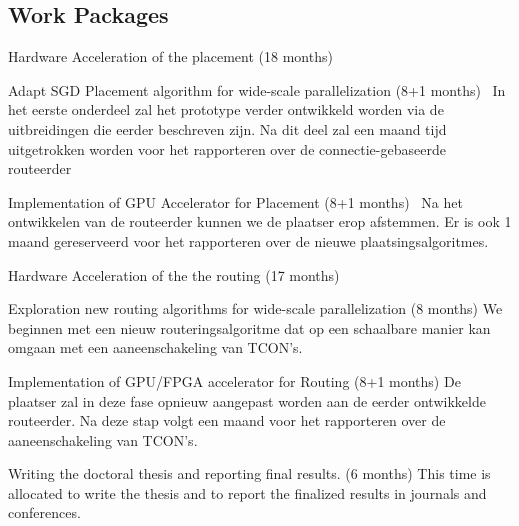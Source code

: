 \documentclass[a4paper,oneside,12pt]{article}
\begin{document}
\subsection{Work Packages}
\begin{description*}
\item[Hardware Acceleration of the placement (18 months)]\

\begin{description*}
\item[Adapt SGD Placement algorithm for wide-scale parallelization (8+1 months)]\
In het eerste onderdeel zal het prototype verder ontwikkeld worden via de uitbreidingen die eerder beschreven zijn. Na dit deel zal een maand tijd uitgetrokken worden voor het rapporteren over de connectie-gebaseerde routeerder
\item[Implementation of GPU Accelerator for Placement (8+1 months)]\
Na het ontwikkelen van de routeerder kunnen we de plaatser erop afstemmen. Er is ook 1 maand gereserveerd voor het rapporteren over de nieuwe plaatsingsalgoritmes.
\end{description*}

\item[Hardware Acceleration of the the routing (17 months)]\

\begin{description*}
\item[Exploration new routing algorithms for wide-scale parallelization (8 months)] 
We beginnen met een nieuw routeringsalgoritme dat op een schaalbare manier kan omgaan met een aaneenschakeling van TCON's.
\item[Implementation of GPU/FPGA accelerator for Routing (8+1 months)]
De plaatser zal in deze fase opnieuw aangepast worden aan de eerder ontwikkelde routeerder. Na deze stap volgt een maand voor het rapporteren over de aaneenschakeling van TCON's.
\end{description*}

\item[Writing the doctoral thesis and reporting final results. (6 months)] This time is allocated to write the thesis and to report the finalized results in journals and conferences.  

\end{description*}
\end{document}
